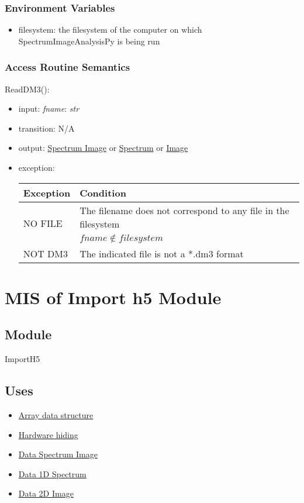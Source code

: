 \documentclass[12pt, titlepage]{article}
\newcommand{\progname}{SpectrumImageAnalysisPy}
\begin{document}
\subsubsection{Environment Variables}
\begin{itemize}
    \item filesystem: the filesystem of the computer on which \progname{} is being
    run
\end{itemize}
\subsubsection{Access Routine Semantics}

\noindent ReadDM3():
\begin{itemize}
    \item input: \textit{fname}: \textit{str}
    \item transition: N/A
    \item output: \hyperref[Mod:SI]{Spectrum Image} or
    \hyperref[Mod:Spectrum]{Spectrum} or \hyperref[Mod:Image]{Image}
    \item exception: 
    \begin{center}
        \begin{tabular}{p{3cm} p{12cm}}
            \toprule[0.15em]
            \textbf{Exception} & \textbf{Condition}\\
            \midrule[0.1em]
            \multirow{2}{0.25\textwidth}{NO FILE} & The filename does not correspond
            to any file in the filesystem\\ 
            & $fname \notin filesystem$\\ 
            \midrule[0.05em]
            NOT DM3 & The indicated file is not a *.dm3 format\\
            \bottomrule[0.15em]
        \end{tabular}
    \end{center}
    
\end{itemize}

\section{MIS of Import h5 Module} \label{Mod:ImportH5} 

\subsection{Module}
ImportH5

\subsection{Uses}
\begin{itemize}
    \item \hyperref[Mod:Array]{Array data structure}
    \item \hyperref[Mod:HH]{Hardware hiding}
    \item \hyperref[Mod:SI]{Data Spectrum Image}
    \item \hyperref[Mod:Spectrum]{Data 1D Spectrum}
    \item \hyperref[Mod:Image]{Data 2D Image}
\end{itemize}
\end{document}
